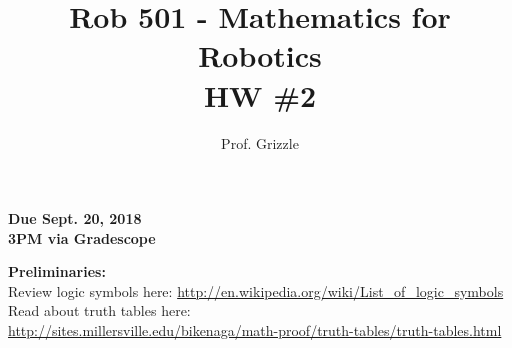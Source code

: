 \documentclass[letterpaper]{article}
\author{Prof. Grizzle}
\title{Rob 501 - Mathematics for Robotics\\
HW \#2}
\begin{document}
\date{}
\maketitle


 \newcommand{\trace}{\mathrm{trace}}
\newcommand{\real}{\mathbb R}  %
\newcommand{\nat}{\mathbb N}   %
\newcommand{\cp}{\mathbb C}    %
\newcommand{\ds}{\displaystyle}
\newcommand{\mf}[2]{\frac{\ds #1}{\ds #2}}
\newcommand{\book}[2]{{Luenberger, Page~#1, }{Prob.~#2}}
\newcommand{\Nagy}[2]{{Nagy, Page~#1, }{Prob.~#2}}
\newcommand{\spanof}[1]{\textrm{span} \{ #1 \}}
\parindent 0pt


\begin{flushright}
{\bfseries Due Sept. 20, 2018} \\
{\bfseries 3PM via Gradescope} \\[3mm]
\end{flushright}

\noindent \textbf{Preliminaries:} \\
Review logic symbols here: \url{http://en.wikipedia.org/wiki/List_of_logic_symbols} \\
Read about truth tables here:\\
\url{http://sites.millersville.edu/bikenaga/math-proof/truth-tables/truth-tables.html}


\end{document}

